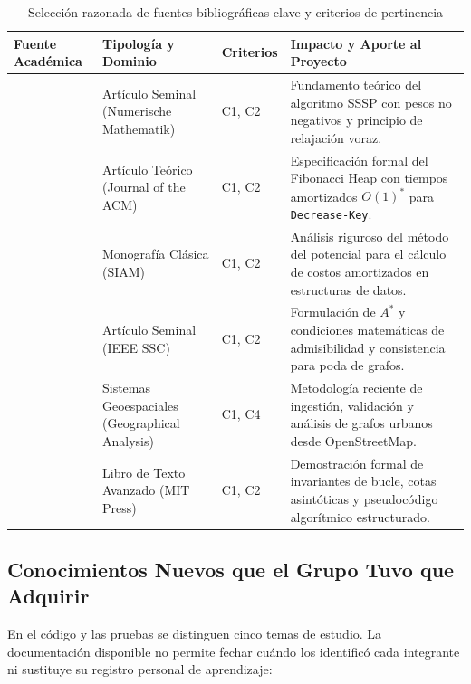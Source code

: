 \begin{table}[H]
    \centering
    \fontsize{9.2}{11.2}\selectfont
    \renewcommand{\arraystretch}{1.15}
    \caption{Selección razonada de fuentes bibliográficas clave y criterios de pertinencia}
    \label{tab:criterios_fuentes}
    \begin{tabularx}{\textwidth}{@{}>{\raggedright\arraybackslash}p{3.5cm} >{\raggedright\arraybackslash}p{3.7cm} >{\centering\arraybackslash}p{1.4cm} >{\raggedright\arraybackslash}X@{}}
        \toprule
        \textbf{Fuente Académica} & \textbf{Tipología y Dominio} & \textbf{Criterios} & \textbf{Impacto y Aporte al Proyecto} \\
        \midrule
        \textcite{dijkstra1959note} & Artículo Seminal (Numerische Mathematik) & C1, C2 & Fundamento teórico del algoritmo SSSP con pesos no negativos y principio de relajación voraz. \\
        \textcite{fredman1987fibonacci} & Artículo Teórico (Journal of the ACM) & C1, C2 & Especificación formal del Fibonacci Heap con tiempos amortizados $O(1)^*$ para \texttt{Decrease-Key}. \\
        \textcite{tarjan1983data} & Monografía Clásica (SIAM) & C1, C2 & Análisis riguroso del método del potencial para el cálculo de costos amortizados en estructuras de datos. \\
        \textcite{hart1968formal} & Artículo Seminal (IEEE SSC) & C1, C2 & Formulación de $A^*$ y condiciones matemáticas de admisibilidad y consistencia para poda de grafos. \\
        \textcite{boeing2025osmnx} & Sistemas Geoespaciales (Geographical Analysis) & C1, C4 & Metodología reciente de ingestión, validación y análisis de grafos urbanos desde OpenStreetMap. \\
        \textcite{cormen2022introduction} & Libro de Texto Avanzado (MIT Press) & C1, C2 & Demostración formal de invariantes de bucle, cotas asintóticas y pseudocódigo algorítmico estructurado. \\
        \bottomrule
    \end{tabularx}
\end{table}

\subsection{Conocimientos Nuevos que el Grupo Tuvo que Adquirir}
\label{sec:conocimientos_nuevos}
En el código y las pruebas se distinguen cinco temas de estudio. La documentación disponible no permite fechar cuándo los identificó cada integrante ni sustituye su registro personal de aprendizaje:

